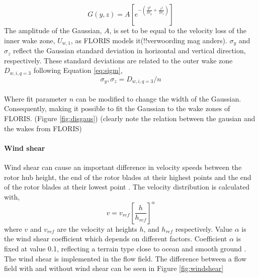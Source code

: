 \begin{equation}
\label{eq:gaus}
G(y, z) = A [e^{-(\frac{y^2}{2\sigma_y} + \frac{z^2}{2\sigma_z})}]
\end{equation}
The amplitude of the Gaussian, $A$, is set to be equal to the velocity loss of the inner wake zone, $U_{w,1}$, as FLORIS models it(!!verwoording mag anders). $\sigma_y$ and $\sigma_z$ reflect the Gaussian standard deviation in horizontal and vertical direction, respectively. These standard deviations are related to the outer wake zone $D_{w,i,q=3}$ following Equation \ref{eq:sigm},
\begin{equation}
\label{eq:sigm}
\sigma_y,\sigma_z = D_{w,i,q=3}/n 
\end{equation}
\\
Where fit parameter $n$ can be modified to change the width of the Gaussian. Consequently, making it possible to fit the Gaussian to the wake zones of FLORIS. (Figure \ref{fig:disgaus})
(clearly note the relation between the gausian and the wakes from FLORIS)

\paragraph{Wind shear} \label{sec:windshear}
Wind shear can cause an important difference in velocity speeds between the rotor hub height, the end of the rotor blades at their highest points and the end of the rotor blades at their lowest point \cite{Firtin2011}.  The velocity distribution is calculated with, 
\begin{equation}
\label{eq:shear}
v = v_{ref} \left[\frac{h}{h_{ref}}\right]^\alpha
\end{equation}
where $v$ and $v_{ref}$ are the velocity at heights $h$, and $h_{ref}$  respectively. Value $\alpha$ is the wind shear coefficient which depends on different factors. Coefficient $\alpha$ is fixed at value 0.1, reflecting a terrain type close to ocean and smooth ground \cite{Firtin2011}. The wind shear is implemented in the flow field. The difference between a flow field with and without wind shear can be seen in Figure \ref{fig:windshear}

